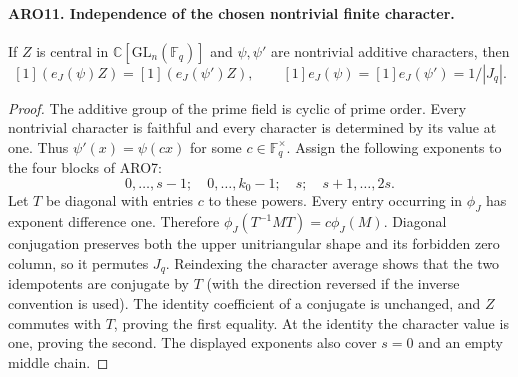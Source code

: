 \documentclass[11pt,a4paper]{article}
\numberwithin{equation}{section}
\theoremstyle{remark}\newtheorem{remark}[theorem]{Remark}
\begin{document}
\paragraph{ARO11. Independence of the chosen nontrivial finite character.}
\label{claim:ARO11}
If \(Z\) is central in \(\mathbb C[\mathrm{GL}_n(\mathbb F_q)]\)
and \(\psi,\psi'\) are nontrivial additive characters, then
\[
 [1](e_J(\psi)Z)=[1](e_J(\psi')Z),
 \qquad [1]e_J(\psi)=[1]e_J(\psi')=1/|J_q|.
 \tag{ARO.13}
\]
\begin{proof}
The additive group of the prime field is cyclic of prime order.
Every nontrivial character is faithful and every character is
determined by its value at one.  Thus
\(\psi'(x)=\psi(cx)\) for some \(c\in\mathbb F_q^\times\).
Assign the following exponents to the four blocks of ARO7:
\[
 0,\ldots,s-1;\quad 0,\ldots,k_0-1;\quad s;\quad
                                  s+1,\ldots,2s.
\]
Let \(T\) be diagonal with entries \(c\) to these powers.
Every entry occurring in \(\phi_J\) has exponent difference one.
Therefore \(\phi_J(T^{-1}MT)=c\phi_J(M)\).  Diagonal conjugation
preserves both the upper unitriangular shape and its forbidden
zero column, so it permutes \(J_q\).  Reindexing the character
average shows that the two idempotents are conjugate by \(T\)
(with the direction reversed if the inverse convention is used).
The identity coefficient of a conjugate is unchanged, and \(Z\)
commutes with \(T\), proving the first equality.  At the identity
the character value is one, proving the second.  The displayed
exponents also cover \(s=0\) and an empty middle chain.
\end{proof}

\end{document}
